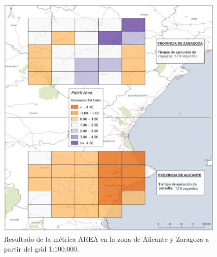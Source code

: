 \begin{figure}
\begin{center}
\includegraphics[width=\textwidth]{ResultadosyDiscusion/Figs/Results/p_100.png}
\caption{Resultado de la métrica AREA en la zona de Alicante y Zaragoza a partir del grid 1:100.000.}
\end{center}
\end{figure}

